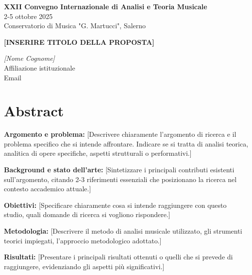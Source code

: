 \documentclass[12pt,a4paper]{article}
\newcommand{\convegnotitolo}{XXII Convegno Internazionale di Analisi e Teoria Musicale}
\newcommand{\convegnodate}{2-5 ottobre 2025}
\newcommand{\convegnosede}{Conservatorio di Musica "G. Martucci", Salerno}
\begin{document}
\begin{center}
{\small \textbf{\convegnotitolo} \\
\convegnodate \\
\convegnosede}
\end{center}

\vspace{1cm}

\begin{center}
{\Large \textbf{[INSERIRE TITOLO DELLA PROPOSTA]}}
\end{center}

\vspace{0.5cm}

\begin{center}
{\textit{[Nome Cognome]} \\
Affiliazione istituzionale \\
Email}
\end{center}

\vspace{1cm}

\section*{Abstract}

\textbf{Argomento e problema:} [Descrivere chiaramente l'argomento di ricerca e il problema specifico che si intende affrontare. Indicare se si tratta di analisi teorica, analitica di opere specifiche, aspetti strutturali o performativi.]

\textbf{Background e stato dell'arte:} [Sintetizzare i principali contributi esistenti sull'argomento, citando 2-3 riferimenti essenziali che posizionano la ricerca nel contesto accademico attuale.]

\textbf{Obiettivi:} [Specificare chiaramente cosa si intende raggiungere con questo studio, quali domande di ricerca si vogliono rispondere.]

\textbf{Metodologia:} [Descrivere il metodo di analisi musicale utilizzato, gli strumenti teorici impiegati, l'approccio metodologico adottato.]

\textbf{Risultati:} [Presentare i principali risultati ottenuti o quelli che si prevede di raggiungere, evidenziando gli aspetti più significativi.]
\end{document}

